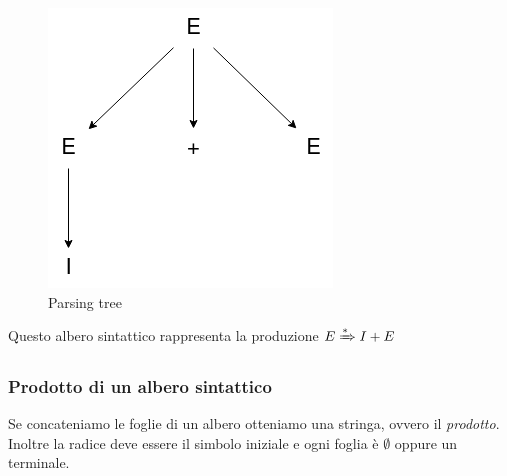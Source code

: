 \documentclass[12pt]{article}
\begin{document}
\begin{figure}[ht]
  \includegraphics[scale = 0.5]{media/produzione.png}
  \centering
  \caption{Parsing tree}
\end{figure}
\newpage
Questo albero sintattico rappresenta la produzione 
$E \xRightarrow[]{*} I + E$

\subsubsection{Prodotto di un albero sintattico} 
Se concateniamo le foglie di un albero otteniamo una stringa, ovvero il \emph{prodotto}. Inoltre la radice deve essere il simbolo iniziale e ogni foglia è $\emptyset$ oppure un terminale. 
\end{document}
